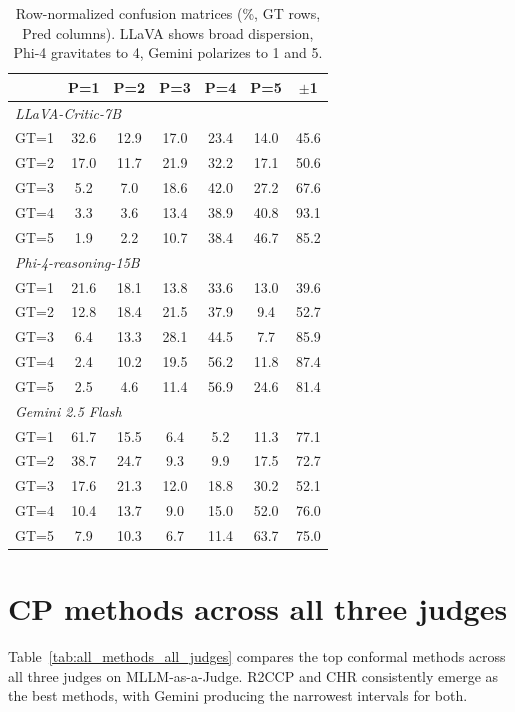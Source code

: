 \documentclass{article}
\begin{document}
\begin{table}[t]
\centering
\caption{Row-normalized confusion matrices (\%, GT rows, Pred columns). LLaVA shows broad dispersion, Phi-4 gravitates to 4, Gemini polarizes to 1 and 5.}
\label{tab:confusion}
\small
\begin{tabular}{l|ccccc|c}
\toprule
& \textbf{P=1} & \textbf{P=2} & \textbf{P=3} & \textbf{P=4} & \textbf{P=5} & $\pm$\textbf{1} \\
\midrule
\multicolumn{7}{l}{\emph{LLaVA-Critic-7B}} \\
GT=1 & 32.6 & 12.9 & 17.0 & 23.4 & 14.0 & 45.6 \\
GT=2 & 17.0 & 11.7 & 21.9 & 32.2 & 17.1 & 50.6 \\
GT=3 & 5.2 & 7.0 & 18.6 & 42.0 & 27.2 & 67.6 \\
GT=4 & 3.3 & 3.6 & 13.4 & 38.9 & 40.8 & 93.1 \\
GT=5 & 1.9 & 2.2 & 10.7 & 38.4 & 46.7 & 85.2 \\
\midrule
\multicolumn{7}{l}{\emph{Phi-4-reasoning-15B}} \\
GT=1 & 21.6 & 18.1 & 13.8 & 33.6 & 13.0 & 39.6 \\
GT=2 & 12.8 & 18.4 & 21.5 & 37.9 & 9.4 & 52.7 \\
GT=3 & 6.4 & 13.3 & 28.1 & 44.5 & 7.7 & 85.9 \\
GT=4 & 2.4 & 10.2 & 19.5 & 56.2 & 11.8 & 87.4 \\
GT=5 & 2.5 & 4.6 & 11.4 & 56.9 & 24.6 & 81.4 \\
\midrule
\multicolumn{7}{l}{\emph{Gemini 2.5 Flash}} \\
GT=1 & 61.7 & 15.5 & 6.4 & 5.2 & 11.3 & 77.1 \\
GT=2 & 38.7 & 24.7 & 9.3 & 9.9 & 17.5 & 72.7 \\
GT=3 & 17.6 & 21.3 & 12.0 & 18.8 & 30.2 & 52.1 \\
GT=4 & 10.4 & 13.7 & 9.0 & 15.0 & 52.0 & 76.0 \\
GT=5 & 7.9 & 10.3 & 6.7 & 11.4 & 63.7 & 75.0 \\
\bottomrule
\end{tabular}
\end{table}

\section{CP methods across all three judges}
\label{app:all_methods}

Table~\ref{tab:all_methods_all_judges} compares the top conformal methods across all three judges on MLLM-as-a-Judge. R2CCP and CHR consistently emerge as the best methods, with Gemini producing the narrowest intervals for both.
\end{document}
